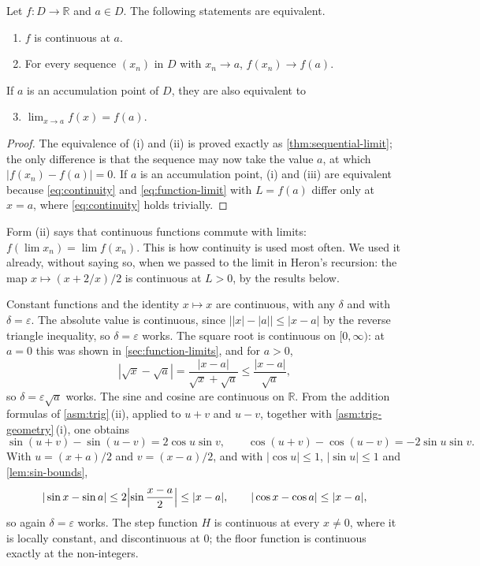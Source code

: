 \begin{theorem}
\label{thm:continuity-forms}
Let $f\colon D\to\mathbb R$ and $a\in D$. The following statements are equivalent.
\begin{enumerate}
\item $f$ is continuous at $a$.
\item For every sequence $(x_n)$ in $D$ with $x_n\to a$, $f(x_n)\to f(a)$.
\end{enumerate}
If $a$ is an accumulation point of $D$, they are also equivalent to
\begin{enumerate}
\setcounter{enumi}{2}
\item $\lim_{x\to a}f(x)=f(a)$.
\end{enumerate}
\end{theorem}

\begin{proof}
The equivalence of (i) and (ii) is proved exactly as \cref{thm:sequential-limit}; the only difference is that the sequence may now take the value $a$, at which $|f(x_n)-f(a)|=0$. If $a$ is an accumulation point, (i) and (iii) are equivalent because \eqref{eq:continuity} and \eqref{eq:function-limit} with $L=f(a)$ differ only at $x=a$, where \eqref{eq:continuity} holds trivially.
\end{proof}

Form (ii) says that continuous functions commute with limits: $f(\lim x_n)=\lim f(x_n)$. This is how continuity is used most often. We used it already, without saying so, when we passed to the limit in Heron's recursion: the map $x\mapsto(x+2/x)/2$ is continuous at $L>0$, by the results below.

Constant functions and the identity $x\mapsto x$ are continuous, with any $\delta$ and with $\delta=\varepsilon$. The absolute value is continuous, since $\bigl||x|-|a|\bigr|\le|x-a|$ by the reverse triangle inequality, so $\delta=\varepsilon$ works. The square root is continuous on $[0,\infty)$: at $a=0$ this was shown in \cref{sec:function-limits}, and for $a>0$,
\[
|\sqrt x-\sqrt a|=\frac{|x-a|}{\sqrt x+\sqrt a}\le\frac{|x-a|}{\sqrt a},
\]
so $\delta=\varepsilon\sqrt a$ works. The sine and cosine are continuous on $\mathbb R$. From the addition formulas of \cref{asm:trig}\,(ii), applied to $u+v$ and $u-v$, together with \cref{asm:trig-geometry}\,(i), one obtains
\[
\sin(u+v)-\sin(u-v)=2\cos u\sin v,\qquad\cos(u+v)-\cos(u-v)=-2\sin u\sin v .
\]
With $u=(x+a)/2$ and $v=(x-a)/2$, and with $|\cos u|\le1$, $|\sin u|\le1$ and \cref{lem:sin-bounds},
\begin{equation}
|\sin x-\sin a|\le2\Bigl|\sin\frac{x-a}2\Bigr|\le|x-a|,\qquad|\cos x-\cos a|\le|x-a| ,
\label{eq:sin-lipschitz}
\end{equation}
so again $\delta=\varepsilon$ works. The step function $H$ is continuous at every $x\ne0$, where it is locally constant, and discontinuous at $0$; the floor function is continuous exactly at the non-integers.

